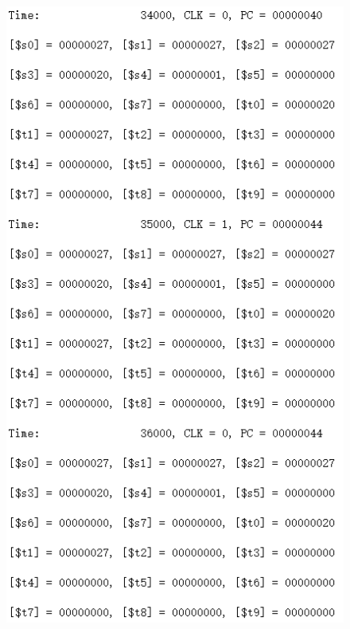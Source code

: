 \documentclass[12pt]{article}
\begin{document}
\begin{figure}[H]
\centering
\includegraphics[scale=1]{R12.jpg}
\end{figure}
\end{document}
